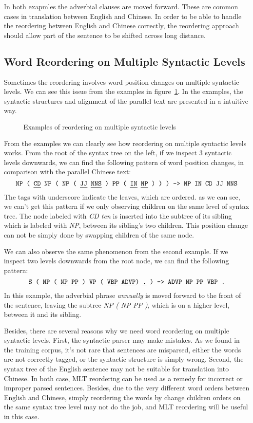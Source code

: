 In both exapmles the adverbial clauses are moved forward. These are common cases in translation between English and Chinese. In order to be able to handle the reordering between English and Chinese correctly, the reordering approach should allow part of the sentence to be shifted across long distance.

\subsection{Word Reordering on Multiple Syntactic Levels}

Sometimes the reordering involves word position changes on multiple syntactic levels. We can see this issue from the examples in figure~\ref{unstructured}. In the examples, the syntactic structures and alignment of the parallel text are presented in a intuitive way.

\begin{figure}[H]
\centering
\subfigure {

}
\subfigure {

}
\caption{Examples of reordering on multiple syntactic levels}
\label{unstructured}
\end{figure}

From the examples we can clearly see how reordering on multiple syntactic levels works. From the root of the syntax tree on the left, if we inspect $3$ syntactic levels downwards, we can find the following pattern of word position changes, in comparison with the parallel Chinese text:
$$\texttt{NP ( \ul{CD} NP ( NP ( \ul{JJ} \ul{NNS} ) PP ( \ul{IN} \ul{NP} ) ) ) -> NP IN CD JJ NNS}$$
The tags with underscore indicate the leaves, which are ordered. as we can see, we can't get this pattern if we only observing children on the same level of syntax tree. The node labeled with \emph{CD ten} is inserted into the subtree of its sibling which is labeled with \emph{NP}, between its sibling's two children. This position change can not be simply done by swapping children of the same node.

We can also observe the same phenomenon from the second example. If we inspect two levels downwards from the root node, we can find the following pattern:
$$\texttt{S ( NP ( \ul{NP} \ul{PP} ) VP ( \ul{VBP} \ul{ADVP}) \ul{.} ) -> ADVP NP PP VBP .}$$
In this example, the adverbial phrase \emph{annually} is moved forward to the front of the sentence, leaving the subtree \emph{NP ( NP PP )}, which is on a higher level, between it and its sibling.

Besides, there are several reasons why we need word reordering on multiple syntactic levels. First, the syntactic parser may make mistakes. As we found in the training corpus, it's not rare that sentences are misparsed, either the words are not correctly tagged, or the syntactic structure is simply wrong. Second, the syntax tree of the English sentence may not be suitable for translation into Chinese. In both case, MLT reordering can be used as a remedy for incorrect or improper parsed sentences. Besides, due to the very different word orders between English and Chinese, simply reordering the words by change children orders on the same syntax tree level may not do the job, and MLT reordering will be useful in this case.


